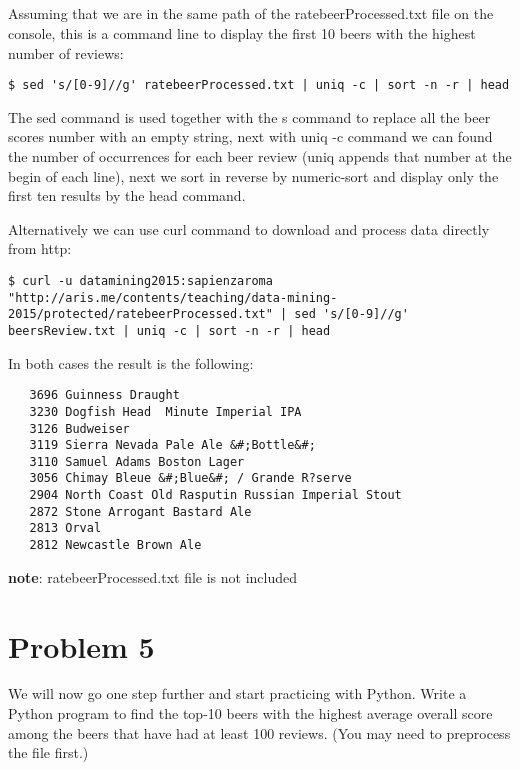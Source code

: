 \documentclass{article}
\begin{document}
\subsection{}
Assuming that we are in the same path of the ratebeerProcessed.txt file on the console, this is a command line to display the first 10 beers with the highest number of reviews:

\begin{lstlisting} 
$ sed 's/[0-9]//g' ratebeerProcessed.txt | uniq -c | sort -n -r | head
\end{lstlisting}

The sed command is used together with the s command to replace all the beer scores number with an empty string, next with uniq -c command we can found the number of occurrences for each beer review (uniq appends that number at the begin of each line), next we sort in reverse by numeric-sort and display only the first ten results by the head command.

Alternatively we can use curl command to download and process data directly from http: 

\begin{lstlisting} 
$ curl -u datamining2015:sapienzaroma "http://aris.me/contents/teaching/data-mining-2015/protected/ratebeerProcessed.txt" | sed 's/[0-9]//g' beersReview.txt | uniq -c | sort -n -r | head
\end{lstlisting}

In both cases the result is the following: 

\begin{lstlisting} 
   3696 Guinness Draught	
   3230 Dogfish Head  Minute Imperial IPA	
   3126 Budweiser	
   3119 Sierra Nevada Pale Ale &#;Bottle&#;	
   3110 Samuel Adams Boston Lager	
   3056 Chimay Bleue &#;Blue&#; / Grande R?serve	
   2904 North Coast Old Rasputin Russian Imperial Stout	
   2872 Stone Arrogant Bastard Ale	
   2813 Orval	
   2812 Newcastle Brown Ale	
\end{lstlisting}

\textbf{note}: ratebeerProcessed.txt file is not included


\section{Problem 5}
We will now go one step further and start practicing with Python. Write a Python program to find the top-10 beers with the highest average overall score among the beers that have had at least 100 reviews. (You may need to preprocess the file first.)
\end{document}
